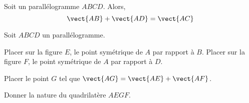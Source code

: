 \documentclass{article}
\begin{document}
\begin{proposition}
Soit un parallélogramme $ABCD$. Alors,
\begin{equation*}
\vect{AB} + \vect{AD} = \vect{AC}
\end{equation*}
\end{proposition}

\begin{example}
Soit $ABCD$ un parallélogramme.
\begin{center}
\end{center}
\begin{enumquestions}
\item Placer sur la figure $E$, le point symétrique de $A$ par rapport à $B$. Placer sur la figure $F$, le point symétrique de $A$ par rapport à $D$.
\item Placer le point $G$ tel que $\vect{AG} = \vect{AE} + \vect{AF}$.
\item Donner la nature du quadrilatère $AEGF$.
\end{enumquestions}
\emptybox{6cm}
\end{example}
\end{document}

